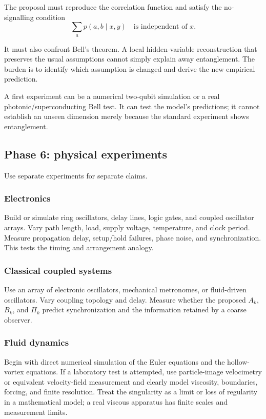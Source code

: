 \documentclass[11pt]{article}
\newcommand{\Coarse}{\Pi}
\theoremstyle{definition}
\theoremstyle{plain}
\theoremstyle{remark}
\begin{document}
The proposal must reproduce the correlation function and satisfy the no-signalling condition
\begin{equation}
  \sum_a p(a,b\mid x,y)
  \quad\text{is independent of }x.
  \label{eq:no-signalling}
\end{equation}

It must also confront Bell's theorem. A local hidden-variable reconstruction that preserves the usual assumptions cannot simply explain away entanglement. The burden is to identify which assumption is changed and derive the new empirical prediction.

A first experiment can be a numerical two-qubit simulation or a real photonic/superconducting Bell test. It can test the model's predictions; it cannot establish an unseen dimension merely because the standard experiment shows entanglement.

\subsection{Phase 6: physical experiments}

Use separate experiments for separate claims.

\subsubsection*{Electronics}

Build or simulate ring oscillators, delay lines, logic gates, and coupled oscillator arrays. Vary path length, load, supply voltage, temperature, and clock period. Measure propagation delay, setup/hold failures, phase noise, and synchronization. This tests the timing and arrangement analogy.

\subsubsection*{Classical coupled systems}

Use an array of electronic oscillators, mechanical metronomes, or fluid-driven oscillators. Vary coupling topology and delay. Measure whether the proposed $A_k$, $B_k$, and $\Coarse_k$ predict synchronization and the information retained by a coarse observer.

\subsubsection*{Fluid dynamics}

Begin with direct numerical simulation of the Euler equations and the hollow-vortex equations. If a laboratory test is attempted, use particle-image velocimetry or equivalent velocity-field measurement and clearly model viscosity, boundaries, forcing, and finite resolution. Treat the singularity as a limit or loss of regularity in a mathematical model; a real viscous apparatus has finite scales and measurement limits.
\end{document}
